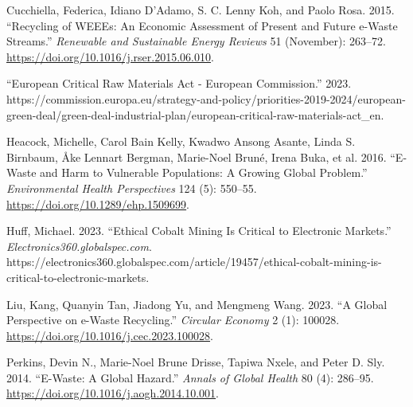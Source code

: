 \documentclass[
  letterpaper,
  DIV=11,
  numbers=noendperiod]{scrartcl}
\newlength{\cslhangindent}
\newenvironment{CSLReferences}[2] %
 {\begin{list}{}{%
  \setlength{\itemindent}{0pt}
  \setlength{\leftmargin}{0pt}
  \setlength{\parsep}{0pt}
  \ifodd #1
   \setlength{\leftmargin}{\cslhangindent}
   \setlength{\itemindent}{-1\cslhangindent}
  \fi
  \setlength{\itemsep}{#2\baselineskip}}}
 {\end{list}}
\begin{document}
\label{refs}
\begin{CSLReferences}{1}{0}
Cucchiella, Federica, Idiano D'Adamo, S. C. Lenny Koh, and Paolo Rosa.
2015. {``Recycling of {WEEEs}: {An} Economic Assessment of Present and
Future e-Waste Streams.''} \emph{Renewable and Sustainable Energy
Reviews} 51 (November): 263--72.
\url{https://doi.org/10.1016/j.rser.2015.06.010}.

{``European {Critical Raw Materials Act} - {European Commission}.''}
2023.
https://commission.europa.eu/strategy-and-policy/priorities-2019-2024/european-green-deal/green-deal-industrial-plan/european-critical-raw-materials-act\_en.

Heacock, Michelle, Carol Bain Kelly, Kwadwo Ansong Asante, Linda S.
Birnbaum, Åke Lennart Bergman, Marie-Noel Bruné, Irena Buka, et al.
2016. {``E-{Waste} and {Harm} to {Vulnerable Populations}: {A Growing
Global Problem}.''} \emph{Environmental Health Perspectives} 124 (5):
550--55. \url{https://doi.org/10.1289/ehp.1509699}.

Huff, Michael. 2023. {``Ethical Cobalt Mining Is Critical to Electronic
Markets.''} \emph{Electronics360.globalspec.com}.
https://electronics360.globalspec.com/article/19457/ethical-cobalt-mining-is-critical-to-electronic-markets.

Liu, Kang, Quanyin Tan, Jiadong Yu, and Mengmeng Wang. 2023. {``A Global
Perspective on e-Waste Recycling.''} \emph{Circular Economy} 2 (1):
100028. \url{https://doi.org/10.1016/j.cec.2023.100028}.

Perkins, Devin N., Marie-Noel Brune Drisse, Tapiwa Nxele, and Peter D.
Sly. 2014. {``E-{Waste}: {A Global Hazard}.''} \emph{Annals of Global
Health} 80 (4): 286--95.
\url{https://doi.org/10.1016/j.aogh.2014.10.001}.

\end{CSLReferences}
\end{document}

